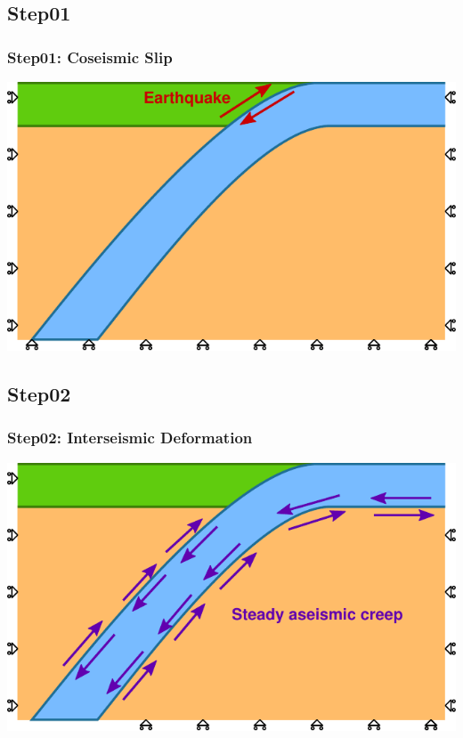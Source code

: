 \documentclass{beamer}
\begin{document}
\subsection{Step01}

\begin{frame}
  \frametitle{Step01: Coseismic Slip}
 
  \begin{center}
    \includegraphics[scale=1.0]{figs/diagram_step01}
  \end{center}

\end{frame}


\subsection{Step02}

\begin{frame}
  \frametitle{Step02: Interseismic Deformation}
 
  \begin{center}
    \includegraphics[scale=1.0]{figs/diagram_step02}
  \end{center}

\end{frame}
\end{document}
